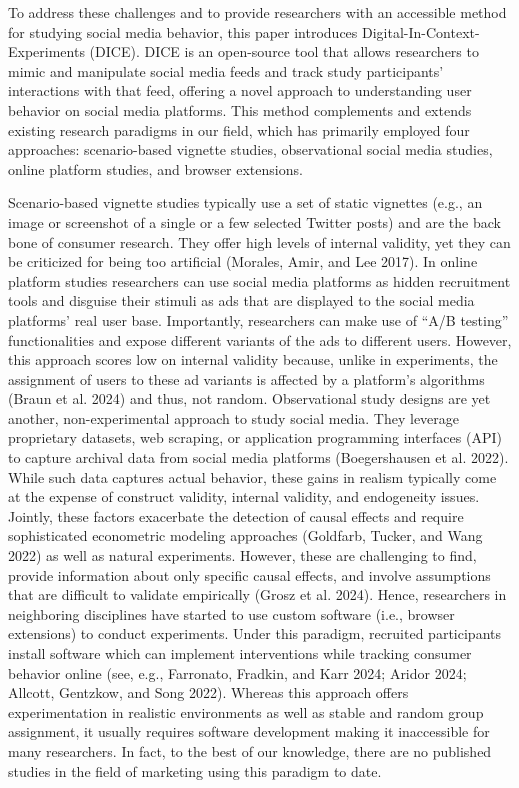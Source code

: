 \documentclass[
  a4paper,
]{scrreprt}
\begin{document}
To address these challenges and to provide researchers with an
accessible method for studying social media behavior, this paper
introduces Digital-In-Context-Experiments (DICE). DICE is an open-source
tool that allows researchers to mimic and manipulate social media feeds
and track study participants' interactions with that feed, offering a
novel approach to understanding user behavior on social media platforms.
This method complements and extends existing research paradigms in our
field, which has primarily employed four approaches: scenario-based
vignette studies, observational social media studies, online platform
studies, and browser extensions.

Scenario-based vignette studies typically use a set of static vignettes
(e.g., an image or screenshot of a single or a few selected Twitter
posts) and are the back bone of consumer research. They offer high
levels of internal validity, yet they can be criticized for being too
artificial (Morales, Amir, and Lee 2017). In online platform studies
researchers can use social media platforms as hidden recruitment tools
and disguise their stimuli as ads that are displayed to the social media
platforms' real user base. Importantly, researchers can make use of
``A/B testing'' functionalities and expose different variants of the ads
to different users. However, this approach scores low on internal
validity because, unlike in experiments, the assignment of users to
these ad variants is affected by a platform's algorithms (Braun et al.
2024) and thus, not random. Observational study designs are yet another,
non-experimental approach to study social media. They leverage
proprietary datasets, web scraping, or application programming
interfaces (API) to capture archival data from social media platforms
(Boegershausen et al. 2022). While such data captures actual behavior,
these gains in realism typically come at the expense of construct
validity, internal validity, and endogeneity issues. Jointly, these
factors exacerbate the detection of causal effects and require
sophisticated econometric modeling approaches (Goldfarb, Tucker, and
Wang 2022) as well as natural experiments. However, these are
challenging to find, provide information about only specific causal
effects, and involve assumptions that are difficult to validate
empirically (Grosz et al. 2024). Hence, researchers in neighboring
disciplines have started to use custom software (i.e., browser
extensions) to conduct experiments. Under this paradigm, recruited
participants install software which can implement interventions while
tracking consumer behavior online (see, e.g., Farronato, Fradkin, and
Karr 2024; Aridor 2024; Allcott, Gentzkow, and Song 2022). Whereas this
approach offers experimentation in realistic environments as well as
stable and random group assignment, it usually requires software
development making it inaccessible for many researchers. In fact, to the
best of our knowledge, there are no published studies in the field of
marketing using this paradigm to date.
\end{document}
